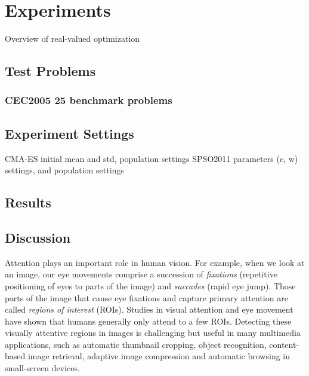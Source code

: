 \chapter{Experiments}
\label{c:experiments}

Overview of real-valued optimization

\section{Test Problems}

\subsection{CEC2005 25 benchmark problems}

\section{Experiment Settings}

CMA-ES initial mean and std, population settings
SPSO2011 parameters (c, w) settings, and population settings

\section{Results}
\section{Discussion}



Attention plays an important role in human vision. For example, when
we look at an image, our eye movements comprise a succession of {\em
fixations} (repetitive positioning of eyes to parts of the image)
and {\em saccades} (rapid eye jump). Those parts of the image that
cause eye fixations and capture primary attention are called {\em
regions of interest} (ROIs). Studies in visual attention and eye
movement have shown that humans generally only attend to a few ROIs.
Detecting these visually attentive regions in images is challenging
but useful in many multimedia applications, such as automatic
thumbnail cropping, object recognition, content-based image
retrieval, adaptive image compression and automatic browsing in
small-screen devices.

